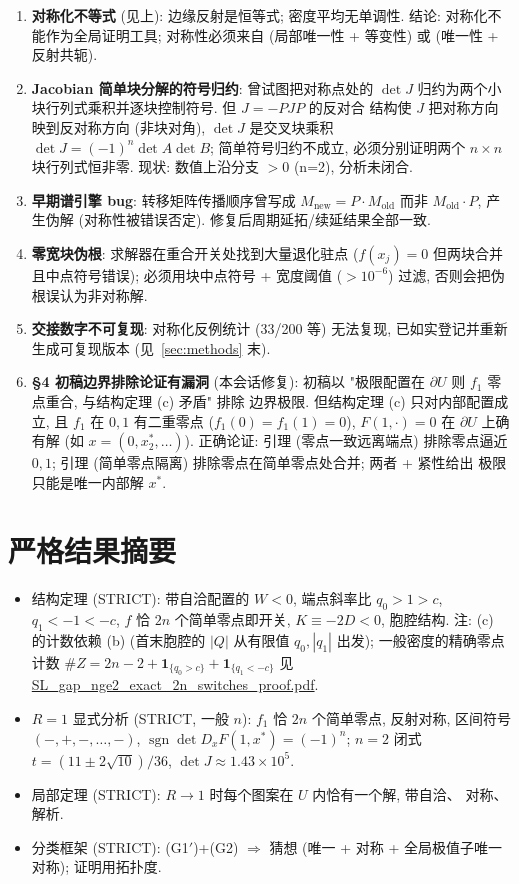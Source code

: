 \documentclass[UTF8]{ctexart}
\begin{document}
\begin{enumerate}
	\item \textbf{对称化不等式} (见上): 边缘反射是恒等式; 密度平均无单调性.
	结论: 对称化不能作为全局证明工具; 对称性必须来自 (局部唯一性 + 等变性)
	或 (唯一性 + 反射共轭).
	\item \textbf{Jacobian 简单块分解的符号归约}: 曾试图把对称点处的
	$\det J$ 归约为两个小块行列式乘积并逐块控制符号. 但 $J=-PJP$ 的反对合
	结构使 $J$ 把对称方向映到反对称方向 (非块对角), $\det J$ 是交叉块乘积
	$\det J=(-1)^n\det A\det B$; 简单符号归约不成立, 必须分别证明两个
	$n\times n$ 块行列式恒非零. 现状: 数值上沿分支 $>0$ (n=2), 分析未闭合.
	\item \textbf{早期谱引擎 bug}: 转移矩阵传播顺序曾写成
	$M_{\text{new}}=P\cdot M_{\text{old}}$ 而非 $M_{\text{old}}\cdot P$,
	产生伪解 (对称性被错误否定). 修复后周期延拓/续延结果全部一致.
	\item \textbf{零宽块伪根}: 求解器在重合开关处找到大量退化驻点
	($f(x_j)=0$ 但两块合并且中点符号错误); 必须用块中点符号 + 宽度阈值
	($>10^{-6}$) 过滤, 否则会把伪根误认为非对称解.
	\item \textbf{交接数字不可复现}: 对称化反例统计 (33/200 等) 无法复现,
	已如实登记并重新生成可复现版本 (见~\ref{sec:methods} 末).
	\item \textbf{§4 初稿边界排除论证有漏洞} (本会话修复): 初稿以
	"极限配置在 $\partial U$ 则 $f_1$ 零点重合, 与结构定理 (c) 矛盾" 排除
	边界极限. 但结构定理 (c) 只对内部配置成立, 且 $f_1$ 在 $0,1$ 有二重零点
	($f_1(0)=f_1(1)=0$), $F(1,\cdot)=0$ 在 $\partial U$ 上确有解 (如
	$x=(0,x_2^*,\dots)$). 正确论证: 引理 (零点一致远离端点) 排除零点逼近
	$0,1$; 引理 (简单零点隔离) 排除零点在简单零点处合并; 两者 + 紧性给出
	极限只能是唯一内部解 $x^*$.
\end{enumerate}

\section{严格结果摘要}\label{sec:strict}

\begin{itemize}
	\item 结构定理 (STRICT): 带自洽配置的 $W<0$, 端点斜率比
	$q_0>1>c$, $q_1<-1<-c$, $f$ 恰 $2n$ 个简单零点即开关, $K\equiv-2D<0$,
	胞腔结构. 注: (c) 的计数依赖 (b) (首末胞腔的 $|Q|$ 从有限值 $q_0,|q_1|$
	出发); 一般密度的精确零点计数
	$\#Z=2n-2+\mathbf1_{\{q_0>c\}}+\mathbf1_{\{q_1<-c\}}$ 见
	\url{SL_gap_nge2_exact_2n_switches_proof.pdf}.
	\item $R=1$ 显式分析 (STRICT, 一般 $n$): $f_1$ 恰 $2n$ 个简单零点,
	反射对称, 区间符号 $(-,+,-,\dots,-)$, $\operatorname{sgn}\det
	D_xF(1,x^*)=(-1)^n$; $n=2$ 闭式 $t=(11\pm2\sqrt{10})/36$,
	$\det J\approx1.43\times10^5$.
	\item 局部定理 (STRICT): $R\to1$ 时每个图案在 $U$ 内恰有一个解, 带自洽、
	对称、解析.
	\item 分类框架 (STRICT): (G1$'$)+(G2) $\Rightarrow$ 猜想 (唯一 + 对称 +
	全局极值子唯一对称); 证明用拓扑度.
\end{itemize}
\end{document}
